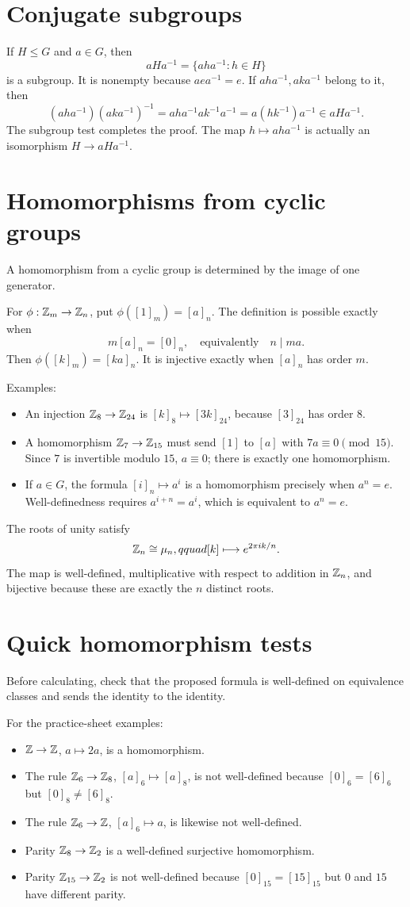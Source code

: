 \documentclass[11pt,openany]{book}
\theoremstyle{definition}
\begin{document}
\section{Conjugate subgroups}
If $H\le G$ and $a\in G$, then
\[
aHa^{-1}=\{aha^{-1}:h\in H\}
\]
is a subgroup. It is nonempty because $aea^{-1}=e$. If $aha^{-1},aka^{-1}$ belong to it, then
\[
(aha^{-1})(aka^{-1})^{-1}
=aha^{-1}ak^{-1}a^{-1}
=a(hk^{-1})a^{-1}\in aHa^{-1}.
\]
The subgroup test completes the proof. The map $h\mapsto aha^{-1}$ is actually an isomorphism $H\to aHa^{-1}$.

\section{Homomorphisms from cyclic groups}
A homomorphism from a cyclic group is determined by the image of one generator.

For $\phi:\mathbb Z_m\to\mathbb Z_n$, put $\phi([1]_m)=[a]_n$. The definition is possible exactly when
\[
m[a]_n=[0]_n,
\quad\text{equivalently}\quad n\mid ma. \tag{16.2}
\]
Then $\phi([k]_m)=[ka]_n$. It is injective exactly when $[a]_n$ has order $m$.

Examples:
\begin{itemize}
\item An injection $\mathbb Z_8\to\mathbb Z_{24}$ is $[k]_8\mapsto[3k]_{24}$, because $[3]_{24}$ has order $8$.
\item A homomorphism $\mathbb Z_7\to\mathbb Z_{15}$ must send $[1]$ to $[a]$ with $7a\equiv0\pmod{15}$. Since $7$ is invertible modulo $15$, $a\equiv0$; there is exactly one homomorphism.
\item If $a\in G$, the formula $[i]_n\mapsto a^i$ is a homomorphism precisely when $a^n=e$. Well-definedness requires $a^{i+n}=a^i$, which is equivalent to $a^n=e$.
\end{itemize}

The roots of unity satisfy
\[
\mathbb Z_n\cong\mu_n,qquad [k]\longmapsto e^{2\pi ik/n}.
\]
The map is well-defined, multiplicative with respect to addition in $\mathbb Z_n$, and bijective because these are exactly the $n$ distinct roots.

\section{Quick homomorphism tests}
Before calculating, check that the proposed formula is well-defined on equivalence classes and sends the identity to the identity.

For the practice-sheet examples:
\begin{itemize}
\item $\mathbb Z\to\mathbb Z$, $a\mapsto2a$, is a homomorphism.
\item The rule $\mathbb Z_6\to\mathbb Z_8$, $[a]_6\mapsto[a]_8$, is not well-defined because $[0]_6=[6]_6$ but $[0]_8\ne[6]_8$.
\item The rule $\mathbb Z_6\to\mathbb Z$, $[a]_6\mapsto a$, is likewise not well-defined.
\item Parity $\mathbb Z_8\to\mathbb Z_2$ is a well-defined surjective homomorphism.
\item Parity $\mathbb Z_{15}\to\mathbb Z_2$ is not well-defined because $[0]_{15}=[15]_{15}$ but $0$ and $15$ have different parity.
\end{itemize}
\end{document}
